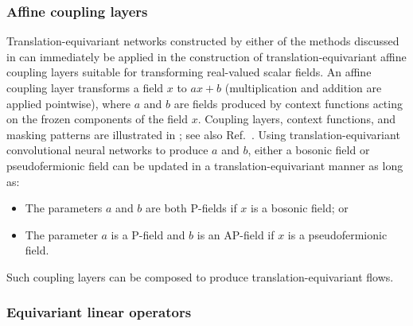 \documentclass[aps,prd,twocolumn,nofootinbib,superscriptaddress,preprintnumbers]{revtex4-1}
\begin{document}
\subsubsection{Affine coupling layers}
\label{sec:affine-flows}

Translation-equivariant networks constructed by either of the methods discussed in  can immediately be applied in the construction of translation-equivariant affine coupling layers suitable for transforming real-valued scalar fields. An affine coupling layer transforms a field $x$ to $ax + b$ (multiplication and addition are applied pointwise), where $a$ and $b$ are fields produced by context functions acting on the frozen components of the field $x$. Coupling layers, context functions, and masking patterns are illustrated in ; see also Ref.~\cite{Albergo:2021vyo}. Using translation-equivariant convolutional neural networks to produce $a$ and $b$, either a bosonic field or pseudofermionic field can be updated in a translation-equivariant manner as long as:

\begin{itemize}
    \item The parameters $a$ and $b$ are both P-fields if $x$ is a bosonic field; or
    \item The parameter $a$ is a P-field and $b$ is an AP-field if $x$ is a pseudofermionic field.
\end{itemize}
%
Such coupling layers can be composed to produce translation-equivariant flows.


\subsubsection{Equivariant linear operators}
\label{sec:parametric-pf-lin}
\end{document}
